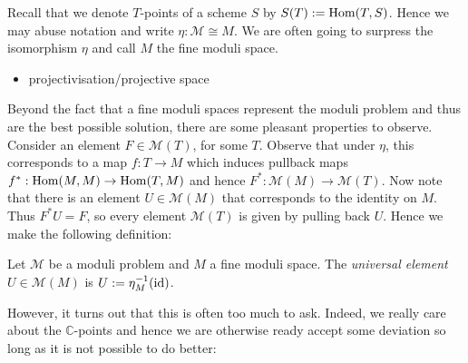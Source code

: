 \documentclass[12pt]{ociamthesis}  %
\begin{document}
Recall that we denote $T$-points of a scheme $S$ by
$S(T) := \operatorname{Hom}(T,S)$. Hence we may abuse notation and write
$\eta : \mathcal M \cong M$. We are often going to surpress the
isomorphism $\eta$ and call $M$ the fine moduli space.

\begin{example}
  \begin{itemize}
    \item projectivisation/projective space
  \end{itemize}
\end{example}

Beyond the fact that a fine moduli spaces represent the moduli
problem and thus are the best possible solution, there are some
pleasant properties to observe. Consider an element
$F\in\mathcal M(T)$, for some $T$. Observe that under $\eta$,
this corresponds to a map $f:T\to M$ which induces pullback maps
$f^* : \operatorname{Hom}(M,M)\to\operatorname{Hom}(T,M)$ and hence
$F^* : \mathcal M(M)\to \mathcal M(T)$.
Now note that there is an element $U\in\mathcal M(M)$ that
corresponds to the identity on $M$. Thus $F^* U = F$, so every
element $\mathcal M(T)$ is given by pulling back $U$. Hence
we make the following definition:

\begin{definition}
  Let $\mathcal M$ be a moduli problem and $M$ a fine moduli space.
  The \emph{universal element} $U\in\mathcal M(M)$ is
  $U:=\eta^{-1}_M (\operatorname{id})$.
\end{definition}

\begin{example}
  \missingexample
\end{example}

However, it turns out that this is often too much to ask. Indeed,
we really care about the $\mathbb{C}$-points and hence
we are otherwise ready accept some deviation so long as it is not
possible to do better:
\end{document}
